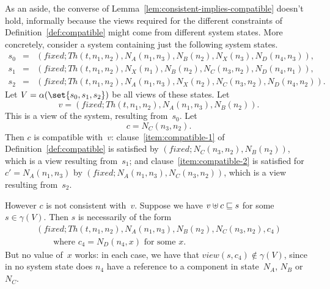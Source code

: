 
As an aside, the converse of Lemma~\ref{lem:consistent-implies-compatible}
doesn't hold, informally because the views required for the different
constraints of Definition~\ref{def:compatible} might come from different
system states.  More concretely, consider a system containing just the
following system states.
%
\begin{eqnarray*}
s_0 & = &
   (fixed; Th(t,n_1,n_2), N_A(n_1,n_3), N_B(n_2), N_X(n_3), N_D(n_4,n_3)), \\
s_1 & = &
  (fixed; Th(t,n_1,n_2), N_X(n_1), N_B(n_2), N_C(n_3,n_2), N_D(n_4,n_1)),\\
s_2 & = & 
  (fixed; Th(t,n_1,n_2), N_A(n_1,n_3), N_X(n_2), N_C(n_3,n_2), N_D(n_4,n_2)).
\end{eqnarray*}
%
Let $V = \alpha(\set{s_0,s_1,s_2})$ be all views of these states.  Let
\[
v = (fixed; Th(t,n_1,n_2), N_A(n_1, n_3), N_B(n_2)).
\]
This is a view of the system, resulting from~$s_0$.  Let 
\[
c = N_C(n_3,n_2).
\]  
Then  $c$ is compatible with~$v$:
%
clause~\ref{item:compatible-1} of Definition~\ref{def:compatible} is satisfied
by $(fixed; N_C(n_3,n_2), N_B(n_2))$, which is a view resulting
from~$s_1$;
%
and clause~\ref{item:compatible-2} is satisfied for $c' = N_A(n_1,n_3)$ by
$(fixed; N_A(n_1, n_3), N_C(n_3,n_2))$, which is a view resulting
from~$s_2$. 

However $c$ is not consistent with~$v$.  Suppose we have \( v \uplus
c \sqsubseteq s \) for some $s \in \gamma(V)$.  Then $s$ is necessarily of the form
\[
\begin{align}
(fixed; Th(t,n_1,n_2), N_A(n_1, n_3), N_B(n_2), N_C(n_3,n_2), c_4) \\
\qquad \mbox{where $c_4 = N_D(n_4,x)$ for some $x$.}
\end{align}
\]
But no value of~$x$ works: in each case, we have that $view(s, c_4) \nin
\gamma(V)$, since in no system state does $n_4$ have a reference to a
component in state~$N_A$, $N_B$ or~$N_C$.
